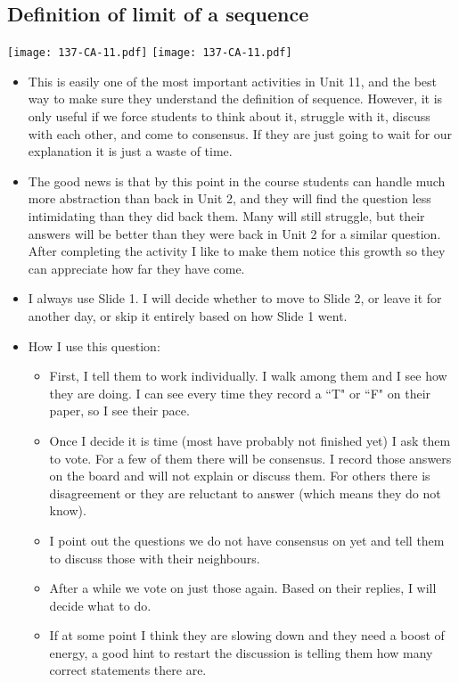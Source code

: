 \documentclass[11pt]{article}
\newcommand{\nl}{\hfill \vspace{-1.1\baselineskip}} %
\begin{document}
\newpage
\subsection{Definition of limit of a sequence} \label{deflimit}

\begin{center}
{ \texttt{[image: 137-CA-11.pdf]}}  \quad
{ \texttt{[image: 137-CA-11.pdf]}} 
\end{center}

\begin{comments}
\nl
	\begin{itemize}
		\item This is easily one of the most important activities in Unit 11, and the best way to make sure they understand the definition of sequence.  However, it is only useful if we force students to think about it, struggle with it, discuss with each other, and come to consensus.  If they are just going to wait for our explanation it is just a waste of time.
		\item The good news is that by this point in the course students can handle much more abstraction than back in Unit 2, and they will find the question less intimidating than they did back them.  Many will still struggle, but their answers will be better than they were back in Unit 2 for a similar question.  After completing the activity I like to make them notice this growth so they can appreciate how far they have come.
		\item I always use Slide 1.  I will decide whether to move to Slide 2, or leave it for another day, or skip it entirely based on how Slide 1 went.
		\item How I use this question:
			\begin{itemize}
				\item First, I tell them to work individually.  I walk among them and I see how they are doing.  I can see every time they record a ``T" or ``F" on their paper, so I see their pace.  
				\item Once I decide it is time (most have probably not finished yet) I ask them to vote.  For a few of them there will be consensus.  I record those answers on the board and will not explain or discuss them.  For others there is disagreement or they are reluctant to answer (which means they do not know).  
				\item I point out the questions we do not have consensus on yet and tell them to discuss those with their neighbours.  
				\item After a while we vote on just those again.   Based on their replies, I will decide what to do.
				\item If at some point I think they are slowing down and they need a boost of energy, a good hint to restart the discussion is telling them how many correct statements there are.
			\end{itemize}
	\end{itemize}
\end{comments}
\end{document}

